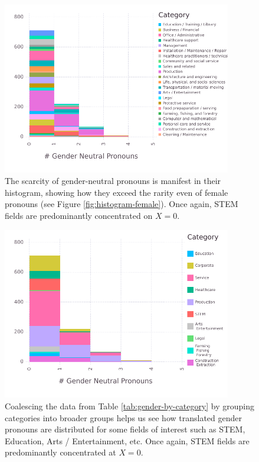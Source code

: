 \documentclass[fleqn,10pt]{article}
\begin{document}
\begin{figure}[H]
	\centering
	\includegraphics[width=10cm]{pictures/histogram-neutral}
	\caption{The scarcity of gender-neutral pronouns is manifest in their histogram, showing how they exceed the rarity even of female pronouns (see Figure \ref{fig:histogram-female}). Once again, STEM fields are predominantly concentrated on $X = 0$.}
	\label{fig:histogram-neutral}
\end{figure}

\begin{figure}[H]
	\centering
	\includegraphics[width=10cm]{pictures/histogram-neutral-grouped}
	\caption{Coalescing the data from Table \ref{tab:gender-by-category} by grouping categories into broader groups helps us see how translated gender pronouns are distributed for some fields of interest such as STEM, Education, Arts / Entertainment, etc. Once again, STEM fields are predominantly concentrated at $X = 0$.}
	\label{fig:histogram-neutral-grouped}
\end{figure}
\end{document}
